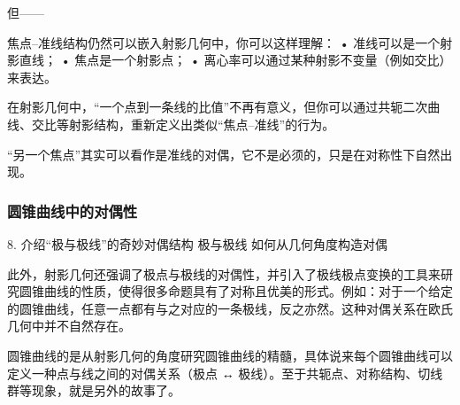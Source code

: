 但——

焦点–准线结构仍然可以嵌入射影几何中，你可以这样理解：
	•	准线可以是一个射影直线；
	•	焦点是一个射影点；
	•	离心率可以通过某种射影不变量（例如交比）来表达。

在射影几何中，“一个点到一条线的比值”不再有意义，但你可以通过共轭二次曲线、交比等射影结构，重新定义出类似“焦点–准线”的行为。

“另一个焦点”其实可以看作是准线的对偶，它不是必须的，只是在对称性下自然出现。


\subsubsection{圆锥曲线中的对偶性}


	8.	介绍“极与极线”的奇妙对偶结构
极与极线	如何从几何角度构造对偶

此外，射影几何还强调了极点与极线的对偶性，并引入了极线极点变换的工具来研究圆锥曲线的性质，使得很多命题具有了对称且优美的形式。例如：对于一个给定的圆锥曲线，任意一点都有与之对应的一条极线，反之亦然。这种对偶关系在欧氏几何中并不自然存在。

圆锥曲线的是从射影几何的角度研究圆锥曲线的精髓，具体说来每个圆锥曲线可以定义一种点与线之间的对偶关系（极点 ↔ 极线）。至于共轭点、对称结构、切线群等现象，就是另外的故事了。


